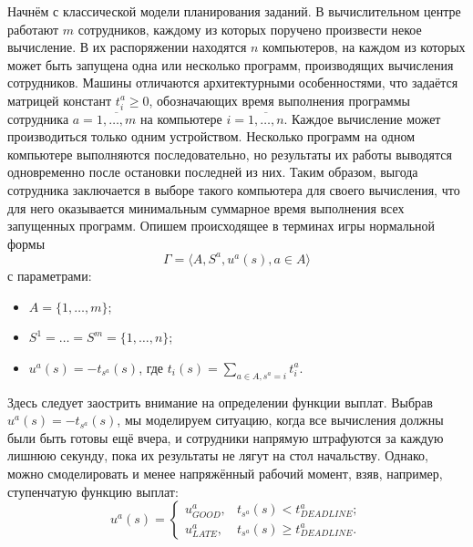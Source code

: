 Начнём с классической модели планирования заданий. В вычислительном центре работают $m$ сотрудников, каждому из которых поручено произвести некое вычисление. В их распоряжении находятся $n$ компьютеров, на каждом из которых может быть запущена одна или несколько программ, производящих вычисления сотрудников. Машины отличаются архитектурными особенностями, что задаётся матрицей констант $t_i^a \ge 0$, обозначающих время выполнения программы сотрудника $a=\overline{1,\ldots,m}$ на компьютере $i=\overline{1,\ldots,n}$. Каждое вычисление может производиться только одним устройством. Несколько программ на одном компьютере выполняются последовательно, но результаты их работы выводятся одновременно после остановки последней из них. Таким образом, выгода сотрудника заключается в выборе такого компьютера для своего вычисления, что для него оказывается минимальным суммарное время выполнения всех запущенных программ. Опишем происходящее в терминах игры нормальной формы
\begin{equation}\label{intro:game}
	\Gamma = \langle A, S^a, u^a(s), a \in A \rangle
\end{equation}
с параметрами:
\begin{itemize}
	\item $A = \{ 1, \ldots, m \}$;
	\item $S^1 = \ldots = S^m = \{ 1, \ldots, n \}$;
	\item $u^a(s) = -t_{s^a}(s)$, где $t_i(s) = \sum\limits_{a \in A, s^a = i} t_i^a$.
\end{itemize}

Здесь следует заострить внимание на определении функции выплат. Выбрав $u^a(s) = -t_{s^a}(s)$, мы моделируем ситуацию, когда все вычисления должны были быть готовы ещё вчера, и сотрудники напрямую штрафуются за каждую лишнюю секунду, пока их результаты не лягут на стол начальству. Однако, можно смоделировать и менее напряжённый рабочий момент, взяв, например, ступенчатую функцию выплат:
\begin{equation*}%
	u^a(s) = \begin{cases}
		u^a_{GOOD}, &t_{s^a}(s) < t^a_{DEADLINE};\\
		u^a_{LATE}, &t_{s^a}(s) \ge t^a_{DEADLINE}.
	\end{cases}
\end{equation*}


